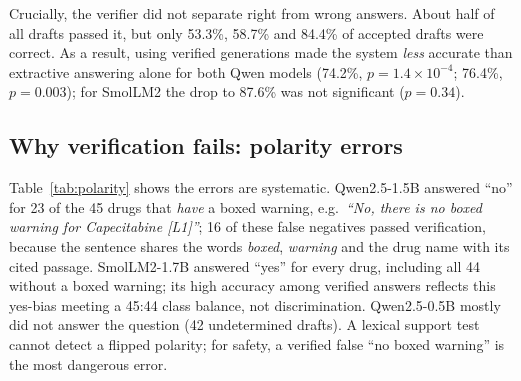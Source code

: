 \documentclass[conference]{IEEEtran}
\begin{document}
Crucially, the verifier did not separate right from wrong answers. About half of all drafts passed it, but only 53.3\%, 58.7\% and 84.4\% of accepted drafts were correct. As a result, using verified generations made the system \emph{less} accurate than extractive answering alone for both Qwen models (74.2\%, $p=1.4\times10^{-4}$; 76.4\%, $p=0.003$); for SmolLM2 the drop to 87.6\% was not significant ($p=0.34$).

\begin{table}[t]
\caption{Task A, ``Does X have a boxed warning?'' (89 test drugs). $p$: exact McNemar vs extractive on the same items}
\label{tab:taskA}
\centering
\setlength{\tabcolsep}{3.2pt}
\end{table}

\subsection{Why verification fails: polarity errors}
Table~\ref{tab:polarity} shows the errors are systematic. Qwen2.5-1.5B answered ``no'' for 23 of the 45 drugs that \emph{have} a boxed warning, e.g.\ \emph{``No, there is no boxed warning for Capecitabine [L1]''}; 16 of these false negatives passed verification, because the sentence shares the words \emph{boxed}, \emph{warning} and the drug name with its cited passage. SmolLM2-1.7B answered ``yes'' for every drug, including all 44 without a boxed warning; its high accuracy among verified answers reflects this yes-bias meeting a 45:44 class balance, not discrimination. Qwen2.5-0.5B mostly did not answer the question (42 undetermined drafts). A lexical support test cannot detect a flipped polarity; for safety, a verified false ``no boxed warning'' is the most dangerous error.
\end{document}
